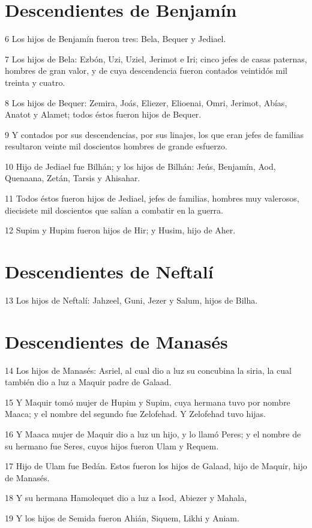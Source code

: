 \section*{Descendientes de Benjamín}

\par 6 Los hijos de Benjamín fueron tres: Bela, Bequer y Jediael.
\par 7 Los hijos de Bela: Ezbón, Uzi, Uziel, Jerimot e Iri; cinco jefes de casas paternas, hombres de gran valor, y de cuya descendencia fueron contados veintidós mil treinta y cuatro.
\par 8 Los hijos de Bequer: Zemira, Joás, Eliezer, Elioenai, Omri, Jerimot, Abías, Anatot y Alamet; todos éstos fueron hijos de Bequer.
\par 9 Y contados por sus descendencias, por sus linajes, los que eran jefes de familias resultaron veinte mil doscientos hombres de grande esfuerzo.
\par 10 Hijo de Jediael fue Bilhán; y los hijos de Bilhán: Jeús, Benjamín, Aod, Quenaana, Zetán, Tarsis y Ahisahar.
\par 11 Todos éstos fueron hijos de Jediael, jefes de familias, hombres muy valerosos, diecisiete mil doscientos que salían a combatir en la guerra.
\par 12 Supim y Hupim fueron hijos de Hir; y Husim, hijo de Aher.

\section*{Descendientes de Neftalí}

\par 13 Los hijos de Neftalí: Jahzeel, Guni, Jezer y Salum, hijos de Bilha.

\section*{Descendientes de Manasés}

\par 14 Los hijos de Manasés: Asriel, al cual dio a luz su concubina la siria, la cual también dio a luz a Maquir padre de Galaad.
\par 15 Y Maquir tomó mujer de Hupim y Supim, cuya hermana tuvo por nombre Maaca; y el nombre del segundo fue Zelofehad. Y Zelofehad tuvo hijas.
\par 16 Y Maaca mujer de Maquir dio a luz un hijo, y lo llamó Peres; y el nombre de su hermano fue Seres, cuyos hijos fueron Ulam y Requem. 
\par 17 Hijo de Ulam fue Bedán. Estos fueron los hijos de Galaad, hijo de Maquir, hijo de Manasés.
\par 18 Y su hermana Hamolequet dio a luz a Isod, Abiezer y Mahala,
\par 19 Y los hijos de Semida fueron Ahián, Siquem, Likhi y Aniam.

